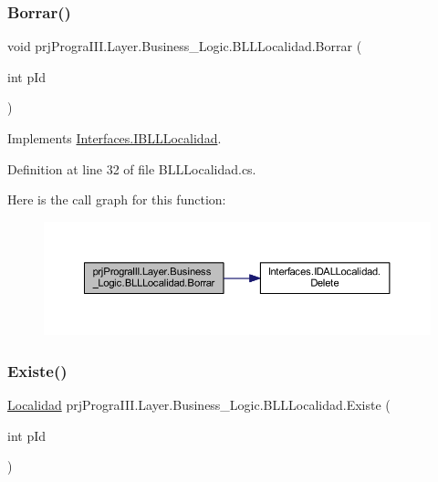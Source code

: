 \subsubsection{\texorpdfstring{Borrar()}{Borrar()}}
{\footnotesize\ttfamily void prj\+Progra\+I\+I\+I.\+Layer.\+Business\+\_\+\+Logic.\+B\+L\+L\+Localidad.\+Borrar (\begin{DoxyParamCaption}\item[{int}]{p\+Id }\end{DoxyParamCaption})}



Implements \hyperlink{interface_interfaces_1_1_i_b_l_l_localidad_aea523587dbbeda757d93e79f4207bcc2}{Interfaces.\+I\+B\+L\+L\+Localidad}.



Definition at line 32 of file B\+L\+L\+Localidad.\+cs.

Here is the call graph for this function\+:
\nopagebreak
\begin{figure}[H]
\begin{center}
\leavevmode
\includegraphics[width=350pt]{classprj_progra_i_i_i_1_1_layer_1_1_business___logic_1_1_b_l_l_localidad_a6f043ce9e0864bd477c37e7d6d228e0e_cgraph}
\end{center}
\end{figure}
\hypertarget{classprj_progra_i_i_i_1_1_layer_1_1_business___logic_1_1_b_l_l_localidad_a41a84b4c9b5c80fcbb5a1dd3e2328742}{}\label{classprj_progra_i_i_i_1_1_layer_1_1_business___logic_1_1_b_l_l_localidad_a41a84b4c9b5c80fcbb5a1dd3e2328742} 
\subsubsection{\texorpdfstring{Existe()}{Existe()}}
{\footnotesize\ttfamily \hyperlink{classprj_progra_i_i_i_1_1_layer_1_1_entities_1_1_localidad}{Localidad} prj\+Progra\+I\+I\+I.\+Layer.\+Business\+\_\+\+Logic.\+B\+L\+L\+Localidad.\+Existe (\begin{DoxyParamCaption}\item[{int}]{p\+Id }\end{DoxyParamCaption})}



